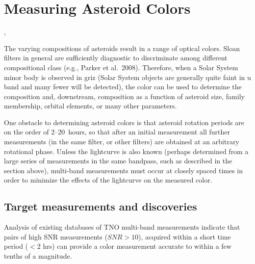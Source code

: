 %
%

\section{Measuring Asteroid Colors}
\def\secname{\chpname:colors}\label{sec:\secname}

,

The varying compositions of asteroids result in a range of optical
colors. Sloan filters in general are sufficiently diagnostic to
discriminate among different compositional class (e.g., Parker et al.\
2008).
Therefore, when a Solar System minor body is observed in griz (Solar
System objects are generally quite faint in u band and many fewer will
be detected),
the color can be used to determine the
composition and, downstream, composition as a function of asteroid size,
family membership, orbital elements, or many other parameters.


One obstacle to determining asteroid colors is that asteroid rotation
periods are on the order of 2--20~hours, so that after an initial
measurement all further measurements (in the same filter, or other
filters) are obtained at an arbitrary rotational phase. Unless the
lightcurve is also known (perhaps determined from a large series of
measurements in the same bandpass, such as described in the section
above), multi-band measurements must occur at closely spaced times in
order to minimize the effects of the lightcurve on the measured color.


\subsection{Target measurements and discoveries}
\label{sec:\secname:targets}

Analysis of existing databases of TNO multi-band measurements indicate
that pairs of high SNR measurements ($SNR>10$), acquired within a short
time period ($<2$ hrs) can provide a color measurement accurate to
within a few tenths
of a magnitude.


